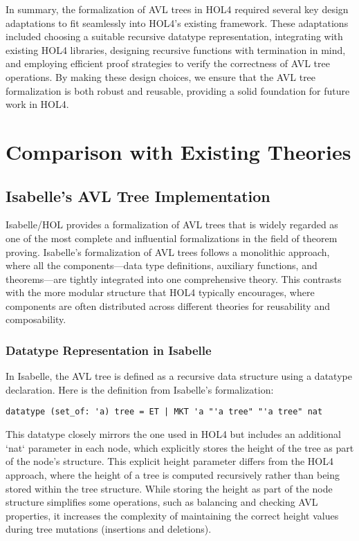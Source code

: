 \documentclass[12pt]{article}
\begin{document}
\begin{itemize}
In summary, the formalization of AVL trees in HOL4 required several key design adaptations to fit seamlessly into HOL4’s existing framework. These adaptations included choosing a suitable recursive datatype representation, integrating with existing HOL4 libraries, designing recursive functions with termination in mind, and employing efficient proof strategies to verify the correctness of AVL tree operations. By making these design choices, we ensure that the AVL tree formalization is both robust and reusable, providing a solid foundation for future work in HOL4.

\section{Comparison with Existing Theories}

\subsection{Isabelle’s AVL Tree Implementation}

Isabelle/HOL \cite{IsabelleAVL} provides a formalization of AVL trees that is widely regarded as one of the most complete and influential formalizations in the field of theorem proving. Isabelle's formalization of AVL trees follows a monolithic approach, where all the components—data type definitions, auxiliary functions, and theorems—are tightly integrated into one comprehensive theory. This contrasts with the more modular structure that HOL4 typically encourages, where components are often distributed across different theories for reusability and composability.

\subsubsection{Datatype Representation in Isabelle}
In Isabelle, the AVL tree is defined as a recursive data structure using a datatype declaration. Here is the definition from Isabelle’s formalization:

\begin{verbatim}
datatype (set_of: 'a) tree = ET | MKT 'a "'a tree" "'a tree" nat
\end{verbatim}

This datatype closely mirrors the one used in HOL4 but includes an additional `nat` parameter in each node, which explicitly stores the height of the tree as part of the node’s structure. This explicit height parameter differs from the HOL4 approach, where the height of a tree is computed recursively rather than being stored within the tree structure. While storing the height as part of the node structure simplifies some operations, such as balancing and checking AVL properties, it increases the complexity of maintaining the correct height values during tree mutations (insertions and deletions).


\end{itemize}
\end{document}
